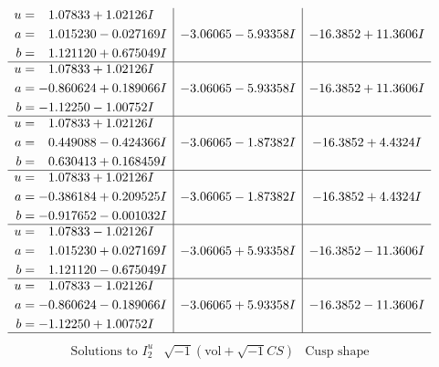 \documentclass[1p]{elsarticle_modified}
\theoremstyle{definition}
\newcommand{\I}{\sqrt{-1}}
\begin{document}
$$\begin{array}{c|c|c}
\begin{aligned}
u &= \phantom{-}1.07833 + 1.02126 I \\
a &= \phantom{-}1.015230 - 0.027169 I \\
b &= \phantom{-}1.121120 + 0.675049 I\end{aligned}
 & -3.06065 - 5.93358 I & -16.3852 + 11.3606 I \\ \hline\begin{aligned}
u &= \phantom{-}1.07833 + 1.02126 I \\
a &= -0.860624 + 0.189066 I \\
b &= -1.12250 - 1.00752 I\end{aligned}
 & -3.06065 - 5.93358 I & -16.3852 + 11.3606 I \\ \hline\begin{aligned}
u &= \phantom{-}1.07833 + 1.02126 I \\
a &= \phantom{-}0.449088 - 0.424366 I \\
b &= \phantom{-}0.630413 + 0.168459 I\end{aligned}
 & -3.06065 - 1.87382 I & -16.3852 + 4.4324 I \\ \hline\begin{aligned}
u &= \phantom{-}1.07833 + 1.02126 I \\
a &= -0.386184 + 0.209525 I \\
b &= -0.917652 - 0.001032 I\end{aligned}
 & -3.06065 - 1.87382 I & -16.3852 + 4.4324 I \\ \hline\begin{aligned}
u &= \phantom{-}1.07833 - 1.02126 I \\
a &= \phantom{-}1.015230 + 0.027169 I \\
b &= \phantom{-}1.121120 - 0.675049 I\end{aligned}
 & -3.06065 + 5.93358 I & -16.3852 - 11.3606 I \\ \hline\begin{aligned}
u &= \phantom{-}1.07833 - 1.02126 I \\
a &= -0.860624 - 0.189066 I \\
b &= -1.12250 + 1.00752 I\end{aligned}
 & -3.06065 + 5.93358 I & -16.3852 - 11.3606 I\\
 \hline 
 \end{array}$$\newpage$$\begin{array}{c|c|c}  
\text{Solutions to }I^u_{2}& \I (\text{vol} + \sqrt{-1}CS) & \text{Cusp shape}\\
 \hline 
\begin{aligned}

\end{aligned}
\end{array}$$
\end{document}
